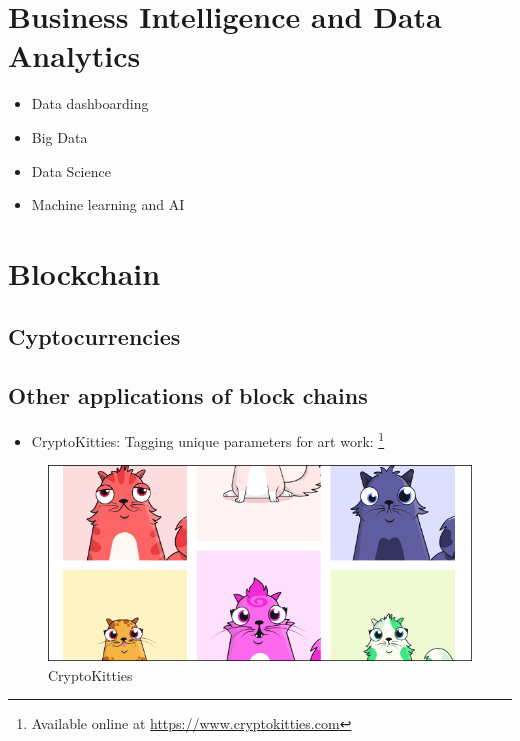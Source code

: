 \documentclass[]{book}
\providecommand{\tightlist}{%
  \setlength{\itemsep}{0pt}\setlength{\parskip}{0pt}}
\let\rmarkdownfootnote\footnote%
\def\footnote{\protect\rmarkdownfootnote}
\begin{document}
\newpage

\hypertarget{business-intelligence-and-data-analytics}{%
\section{Business Intelligence and Data Analytics}\label{business-intelligence-and-data-analytics}}

\begin{itemize}
\tightlist
\item
  Data dashboarding
\item
  Big Data
\item
  Data Science
\item
  Machine learning and AI
\end{itemize}

\hypertarget{blockchain}{%
\section{Blockchain}\label{blockchain}}

\hypertarget{cyptocurrencies}{%
\subsection{Cyptocurrencies}\label{cyptocurrencies}}

\hypertarget{other-applications-of-block-chains}{%
\subsection{Other applications of block chains}\label{other-applications-of-block-chains}}

\begin{itemize}
\tightlist
\item
  CryptoKitties: Tagging unique parameters for art work: \footnote{Available online at \url{https://www.cryptokitties.com}}
\end{itemize}

\begin{figure}
\centering
\includegraphics{images/cryptokitties.png}
\caption{CryptoKitties}
\end{figure}
\end{document}
